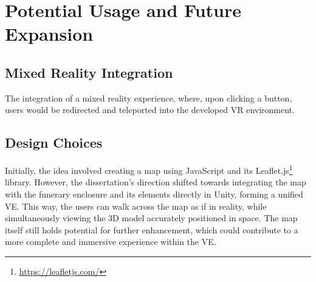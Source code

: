 \section{Potential Usage and Future Expansion}

\subsection{Mixed Reality Integration}
The integration of a mixed reality experience, where, upon clicking a button, users would be redirected and teleported into the developed VR environment. 

\subsection{Design Choices}
Initially, the idea involved creating a map using JavaScript and its Leaflet.js\footnote{\url{https://leafletjs.com/}} library. 
However, the dissertation's direction shifted towards integrating the map with the funerary enclosure and its elements directly in Unity, forming a unified \gls{VE}. This way, the users can walk across the map as if in reality, while simultaneously viewing the \gls{3D} model accurately positioned in space. 
The map itself still holds potential for further enhancement, which could contribute to a more complete and immersive experience within the \gls{VE}.







